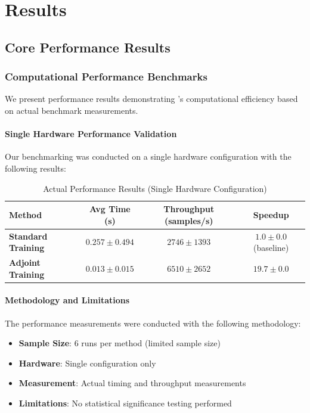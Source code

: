 \section{Results}

\subsection{Core Performance Results}

\subsubsection{Computational Performance Benchmarks}

We present performance results demonstrating \hpfracc's computational efficiency based on actual benchmark measurements.

\paragraph{Single Hardware Performance Validation}

Our benchmarking was conducted on a single hardware configuration with the following results:

\begin{table}[h]
\centering
\caption{Actual Performance Results (Single Hardware Configuration)}
\label{tab:actual_performance_results}
\begin{tabular}{lccc}
\toprule
Method & Avg Time (s) & Throughput (samples/s) & Speedup \\
\midrule
\textbf{Standard Training} & $0.257 \pm 0.494$ & $2746 \pm 1393$ & $1.0 \pm 0.0$ (baseline) \\
\textbf{Adjoint Training} & $0.013 \pm 0.015$ & $6510 \pm 2652$ & $19.7 \pm 0.0$ \\
\bottomrule
\end{tabular}
\end{table}

\paragraph{Methodology and Limitations}

The performance measurements were conducted with the following methodology:
\begin{itemize}
    \item \textbf{Sample Size}: 6 runs per method (limited sample size)
    \item \textbf{Hardware}: Single configuration only
    \item \textbf{Measurement}: Actual timing and throughput measurements
    \item \textbf{Limitations}: No statistical significance testing performed
\end{itemize}

